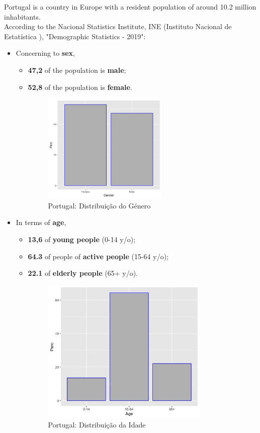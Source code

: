 Portugal is a country in Europe with a resident population of around 10.2 million inhabitants.  \\
According to the Nacional Statistics Institute, INE (Instituto Nacional de Estatística ),  \cite{pubINE} "Demographic Statistics - 2019":
\begin{itemize}
    \item Concerning to \textbf{sex},
    \begin{itemize}
        \item \textbf{47,2\textdiscount} of the population is \textbf{male};
        \item \textbf{52,8 \textdiscount} of the population is \textbf{female}.
\begin{figure}[h!]
\caption{Portugal: Distribuição do Género}
\centering
\includegraphics[width=0.6\textwidth]{Sex.jpeg}
\end{figure}
    \end{itemize}  
    \item In terms of \textbf{age},
    \begin{itemize}
        \item \textbf{13,6\textdiscount} of \textbf{young people} (0-14 y/o);
        \item \textbf{64.3\textdiscount} of people of \textbf{active people} (15-64 y/o);
        \item \textbf{22.1\textdiscount} of \textbf{elderly people} (65+ y/o). 
\begin{figure}[h!]
\caption{Portugal: Distribuição da Idade}
\centering
\includegraphics[width=0.8\textwidth]{Age.jpeg}
\end{figure}
    \end{itemize}
\end{itemize}
